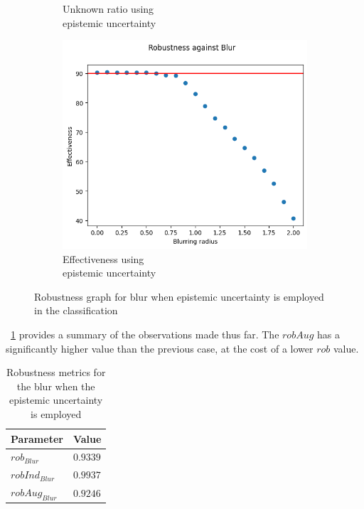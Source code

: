 \begin{figure}[h]
\begin{subfigure}{.33\textwidth}
		\caption{Unknown ratio using \\ epistemic uncertainty}
		\label{fig:bl_eu_unkn}
	\end{subfigure}%
	\begin{subfigure}{.33\textwidth}
		\centering
		\includegraphics[width=0.9\linewidth]{ImageFiles/EvalBNN/BL/EU/eff}
		\caption{Effectiveness using \\ epistemic uncertainty}
		\label{fig:bl_eu_eff}
	\end{subfigure}
	\caption{Robustness graph for blur when epistemic uncertainty is employed in the classification}
	\label{fig:bl_eu}
\end{figure}

\Tab~\ref{table:rob_bl_eu} provides a summary of the observations made thus far. The $robAug$ has a significantly higher value than the previous case, at the cost of a lower $rob$ value.

\begin{table}[h]
	\centering
	\begin{tabular}{|| l | l ||} 
		\hline
		\textbf{Parameter} & \textbf{Value} \\
		\hline
		\hline
		$rob_{Blur}$ & $0.9339$ \\
		$robInd_{Blur}$ & $0.9937$ \\
		$robAug_{Blur}$ & $0.9246$ \\	
		\hline
	\end{tabular}	
	\caption{Robustness metrics for the blur when the epistemic uncertainty is employed}
	\label{table:rob_bl_eu}
\end{table}


